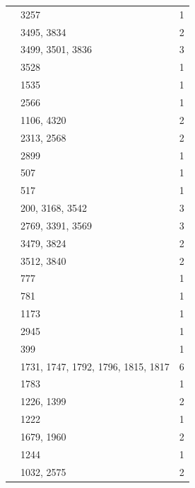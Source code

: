 \begin{longtable}{@{}p{}p{}p{}@{}}
\cite[Theorem~5.2]{AnOBrienWilsonJ4} & 3257 & 1 \\
\cite[Lemma~5.2]{AnWilsonBaby} & 3495, 3834 & 2 \\
\cite[Theorem~5.3]{AnWilsonBaby} & 3499, 3501, 3836 & 3 \\
\cite[Theorem~4.4]{AnWilsonMonster} & 3528 & 1 \\
\cite[Example~4.8]{Bonnafe2005} & 1535 & 1 \\
\cite[Proposition~2.3(b)]{Bonnafe2005} & 2566 & 1 \\
\cite[Proposition~4.11(a)]{Bonnafe2005} & 1106, 4320 & 2 \\
\cite[Proposition~5.3(a)]{Bonnafe2005} & 2313, 2568 & 2 \\
\cite[Lemma~7.4]{BonnafeDatRouquier2017} & 2899 & 1 \\
\cite[Theorem~2.3.2 and Section~3.2]{Bouc2000} & 507 & 1 \\
\cite[Theorem~3.5.5]{Bouc2000} & 517 & 1 \\
\cite{BreuerSporadicOverview} & 200, 3168, 3542 & 3 \\
\cite{CTblLib2025} & 2769, 3391, 3569 & 3 \\
\cite[Section~7]{BreuerMagaardWilsonBaby2020} & 3479, 3824 & 2 \\
\cite[Section~5]{BreuerMagaardWilsonMonster2026} & 3512, 3840 & 2 \\
\cite[Section~2]{BroueMichel1989} & 777 & 1 \\
\cite[Theorem~2.2]{BroueMichel1989} & 781 & 1 \\
\cite[Theorem~1.1]{BroughSchaefferFry2020} & 1173 & 1 \\
\cite[p.~1203]{BroughSchaefferFry2020} & 2945 & 1 \\
\cite[Remark~4.4]{BroughSpath2022} & 399 & 1 \\
\cite[Theorem~4.5]{BroughSpath2022} & 1731, 1747, 1792, 1796, 1815, 1817 & 6 \\
\cite[Theorem~4.5(ii)]{BroughSpath2022} & 1783 & 1 \\
\cite[Theorem~4.4(i)]{CabanesEnguehard1994} & 1226, 1399 & 2 \\
\cite[Theorem~4.4(iii)]{CabanesEnguehard1994} & 1222 & 1 \\
\cite[Proposition~15.6(i)]{CabanesEnguehard2004} & 1679, 1960 & 2 \\
\cite[Proposition~15.7]{CabanesEnguehard2004} & 1244 & 1 \\
\cite[Proposition~9.8(iv)]{CabanesEnguehard2004} & 1032, 2575 & 2 \\

\end{longtable}
